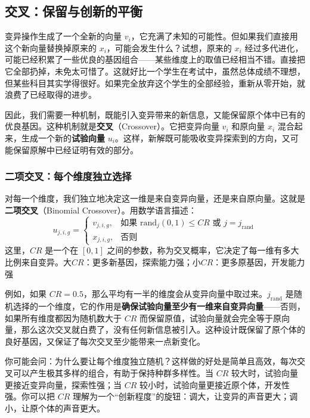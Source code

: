 \documentclass[lang=cn,zihao=-4,a4paper,fontset=windows]{beautybook}
\begin{document}
\subsection{交叉：保留与创新的平衡}

变异操作生成了一个全新的向量 \(v_i\)，它充满了未知的可能性。但如果我们直接用这个新向量替换掉原来的 \(x_i\)，可能会发生什么？试想，原来的 \(x_i\) 经过多代进化，可能已经积累了一些优良的基因组合——某些维度上的取值已经相当不错。直接把它全部扔掉，未免太可惜了。这就好比一个学生在考试中，虽然总体成绩不理想，但某些科目其实学得很好。如果完全放弃这个学生的全部经验，重新从零开始，就浪费了已经取得的进步。

因此，我们需要一种机制，既能引入变异带来的新信息，又能保留原个体中已有的优良基因。这种机制就是\textbf{交叉}（Crossover）。它把变异向量 \(v_i\) 和原向量 \(x_i\) 混合起来，生成一个新的\textbf{试验向量} \(u_i\)。这样，新解既可能吸收变异探索到的方向，又可能保留原解中已经证明有效的部分。

\subsubsection{二项交叉：每个维度独立选择}

\begin{definition}[][二项交叉]
对每一个维度，我们独立地决定这一维是来自变异向量，还是来自原向量。这就是\textbf{二项交叉}（Binomial Crossover）。用数学语言描述：
\[
u_{j,i,g} = 
\begin{cases}
v_{j,i,g}, & \text{如果 } \text{rand}_j(0,1) \leq CR \text{ 或 } j = j_{\text{rand}} \\
x_{j,i,g}, & \text{否则}
\end{cases}
\]
这里，\(CR\) 是一个在 \([0,1]\) 之间的参数，称为交叉概率，它决定了每一维有多大比例来自变异。大$CR$：更多新基因，探索能力强；小$CR$：更多原基因，开发能力强
\end{definition}
例如，如果 \(CR=0.5\)，那么平均有一半的维度会从变异向量中取过来。\(j_{\text{rand}}\) 是随机选择的一个维度，它的作用是\textbf{确保试验向量至少有一维来自变异向量}——否则，如果所有维度都因为随机数大于 \(CR\) 而保留原值，试验向量就会完全等于原向量，那么这次交叉就白费了，没有任何新信息被引入。这种设计既保留了原个体的良好基因，又保证了每次交叉至少能带来一点新变化。

你可能会问：为什么要让每个维度独立随机？这样做的好处是简单且高效，每次交叉可以产生极其多样的组合，有助于保持种群多样性。当 \(CR\) 较大时，试验向量更接近变异向量，探索性强；当 \(CR\) 较小时，试验向量更接近原个体，开发性强。你可以把 \(CR\) 理解为一个“创新程度”的旋钮：调大，让变异的声音更大；调小，让原个体的声音更大。
\end{document}
